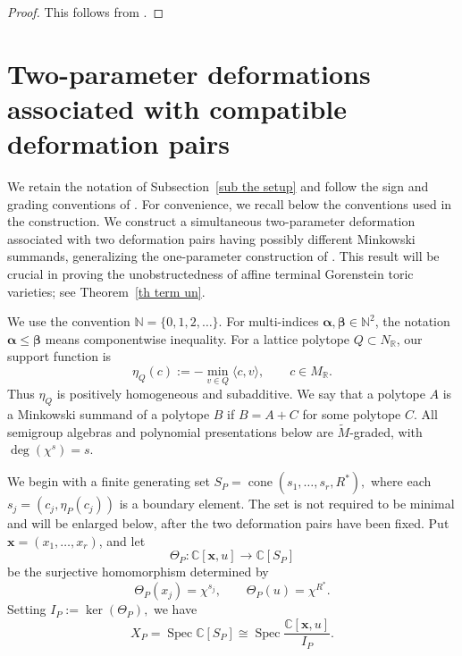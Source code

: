 \documentclass[11pt]{amsart}
\numberwithin{equation}{section}
\theoremstyle{plain}
\theoremstyle{definition}
\newcommand{\0}{$0$-mutable}
\newcommand{\NN}{\ensuremath{\mathbb{N}}}
\newcommand{\RR}{\ensuremath{\mathbb{R}}}
\newcommand{\CC}{\ensuremath{\mathbb{C}}}
\newcommand{\bfx}{\ensuremath{\mathbf{x}}}
\renewcommand{\1}{$1$-rigid}
\renewcommand{\0}{$0$-mutable}
\begin{document}
\begin{proof}
This follows from
\cite[Proposition~4.1, Theorem~6.6]{AvS00}.
\end{proof}












\section{Two-parameter deformations associated with compatible
deformation pairs}
\label{sec compatible two parameter}

{We retain the notation of Subsection~\ref{sub the setup} and follow the
sign and grading conventions of \cite[Sections~2 and~3]{Fil26}. For
convenience, we recall below the conventions used in the construction.}
We construct a simultaneous
two-parameter deformation associated with two deformation pairs having
possibly different Minkowski summands, generalizing the one-parameter
construction of \cite[Section~3]{Fil26}. This result will be crucial in proving the unobstructedness of affine terminal Gorenstein toric varieties; see Theorem~\ref{th term un}.

{We use the convention
\(\NN=\{0,1,2,\ldots\}\). For multi-indices
\(\boldsymbol\alpha,\boldsymbol\beta\in\NN^2\), the notation
\(\boldsymbol\alpha\leq\boldsymbol\beta\) means componentwise
inequality. For a lattice polytope \(Q\subset N_{\RR}\), our support
function is
\[
\eta_Q(c):=-\min_{v\in Q}\langle c,v\rangle,
\qquad c\in M_{\RR}.
\]
Thus \(\eta_Q\) is positively homogeneous and subadditive. We say that
a polytope \(A\) is a Minkowski summand of a polytope \(B\) if
\(B=A+C\) for some polytope \(C\). All semigroup algebras and
polynomial presentations below are \(\widetilde M\)-graded, with
\(\deg(\chi^s)=s\).}

We begin with a finite generating set
$
{S_P=\operatorname{cone} (s_1,\ldots,s_r,R^*)},
$
where each
$
s_j=(c_j,\eta_P(c_j))
$
is a boundary element. The set is not required to be minimal and will
be enlarged below, after the two deformation pairs have been fixed. 
{Put \(\bfx=(x_1,\ldots,x_r)\), and let
\[
\Theta_P\colon
\CC[\bfx,u]\longrightarrow\CC[S_P]
\]
be the surjective homomorphism determined by
\[
\Theta_P(x_j)=\chi^{s_j},
\qquad
\Theta_P(u)=\chi^{R^*}.
\]
Setting
$
I_P:=\ker(\Theta_P),
$
we have
\[
X_P
=
\operatorname{Spec}\CC[S_P]
\cong
\operatorname{Spec}\frac{\CC[\bfx,u]}{I_P}.
\]}
\end{document}

